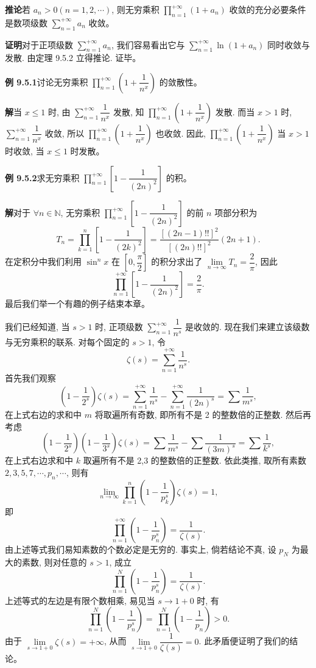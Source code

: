 \documentclass[UTF8, 12pt, fontset=fandol, oneside]{ctexart}
\begin{document}
\noindent\textbf{推论}\quad 若 $a_n>0(n=1,2,\cdots)$, 则无穷乘积 $\prod\limits_{n=1}^{+\infty}(1+a_n)$ 收敛的充分必要条件是数项级数 $\sum\limits_{n=1}^{+\infty}a_n$ 收敛。

\noindent\textbf{证明}\quad 对于正项级数 $\sum\limits_{n=1}^{+\infty}a_n$, 我们容易看出它与 $\sum\limits_{n=1}^{+\infty}\ln(1+a_n)$ 同时收敛与发散. 由定理 9.5.2 立得推论. 证毕。

\noindent\textbf{例 9.5.1}\quad 讨论无穷乘积 $\prod\limits_{n=1}^{+\infty}\left(1+\dfrac1{n^x}\right)$ 的敛散性。

\noindent\textbf{解}\quad 当 $x\leq1$ 时, 由 $\sum\limits_{n=1}^{+\infty}\dfrac1{n^x}$ 发散, 知 $\prod\limits_{n=1}^{+\infty}\left(1+\dfrac1{n^x}\right)$ 发散. 而当 $x>1$ 时, $\sum\limits_{n=1}^{+\infty}\dfrac1{n^x}$ 收敛, 所以 $\prod\limits_{n=1}^{+\infty}\left(1+\dfrac1{n^x}\right)$ 也收敛. 因此, $\prod\limits_{n=1}^{+\infty}\left(1+\dfrac1{n^x}\right)$ 当 $x>1$ 时收敛, 当 $x\leq1$ 时发散。

\noindent\textbf{例 9.5.2}\quad 求无穷乘积 $\prod\limits_{n=1}^{+\infty}\left[1-\dfrac1{(2n)^2}\right]$ 的积。

\noindent\textbf{解}\quad 对于 $\forall n\in\mathbb{N}$, 无穷乘积 $\prod\limits_{n=1}^{+\infty}\left[1-\dfrac1{(2n)^2}\right]$ 的前 $n$ 项部分积为
\[
  T_n=\prod_{k=1}^n\left[1-\frac1{(2k)^2}\right]
  =\frac{[(2n-1)!!]^2}{[(2n)!!]^2}(2n+1).
\]
在定积分中我们利用 $\sin^n x$ 在 $\left[0,\dfrac{\pi}{2}\right]$ 的积分求出了 $\lim\limits_{n\to\infty}T_n=\dfrac2\pi$, 因此
\[
  \prod_{n=1}^{+\infty}\left[1-\frac1{(2n)^2}\right]=\frac2\pi.
\]
最后我们举一个有趣的例子结束本章。

我们已经知道, 当 $s>1$ 时, 正项级数 $\sum\limits_{n=1}^{+\infty}\dfrac1{n^s}$ 是收敛的. 现在我们来建立该级数与无穷乘积的联系. 对每个固定的 $s>1$, 令
\[
  \zeta(s)=\sum_{n=1}^{+\infty}\frac1{n^s}.
\]
首先我们观察
\[
  \left(1-\frac1{2^s}\right)\zeta(s)
  =\sum_{n=1}^{+\infty}\frac1{n^s}-\sum_{n=1}^{+\infty}\frac1{(2n)^s}
  =\sum\frac1{m^s},
\]
在上式右边的求和中 $m$ 将取遍所有奇数, 即所有不是 2 的整数倍的正整数. 然后再考虑
\[
  \left(1-\frac1{2^s}\right)\left(1-\frac1{3^s}\right)\zeta(s)
  =\sum\frac1{m^s}-\sum\frac1{(3m)^s}
  =\sum\frac1{k^s},
\]
在上式右边求和中 $k$ 取遍所有不是 2,3 的整数倍的正整数. 依此类推, 取所有素数 $2,3,5,7,\cdots,p_n,\cdots$, 则有
\[
  \lim_{n\to\infty}\prod_{k=1}^n\left(1-\frac1{p_k^s}\right)\zeta(s)=1,
\]
即
\[
  \prod_{n=1}^{+\infty}\left(1-\frac1{p_n^s}\right)=\frac1{\zeta(s)}.
\]
由上述等式我们易知素数的个数必定是无穷的. 事实上, 倘若结论不真, 设 $p_N$ 为最大的素数, 则对任意的 $s>1$, 成立
\[
  \prod_{n=1}^N\left(1-\frac1{p_n^s}\right)=\frac1{\zeta(s)}.
\]
上述等式的左边是有限个数相乘, 易见当 $s\to1+0$ 时, 有
\[
  \prod_{n=1}^N\left(1-\frac1{p_n^s}\right)=\prod_{n=1}^N\left(1-\frac1{p_n}\right)>0.
\]
由于 $\lim\limits_{s\to1+0}\zeta(s)=+\infty$, 从而 $\lim\limits_{s\to1+0}\dfrac1{\zeta(s)}=0$. 此矛盾便证明了我们的结论。
\end{document}
